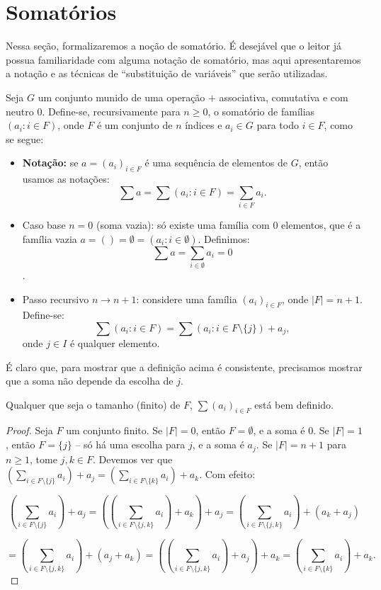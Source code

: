 \section{Somatórios}

Nessa seção, formalizaremos a noção de somatório.
É desejável que o leitor já possua familiaridade com alguma notação de somatório, mas aqui apresentaremos a notação e as técnicas de ``substituição de variáveis'' que serão utilizadas.

\begin{definition}
Seja $G$ um conjunto munido de uma operação $+$ associativa, comutativa e com neutro $0$.
Define-se, recursivamente para $n\geq 0$, o somatório de famílias $(a_i: i \in F)$, onde $F$ é um conjunto de $n$ índices e $a_i \in G$ para todo $i \in F$, como se segue:

\begin{itemize}
    \item \textbf{Notação:} se $a=(a_i)_{i\in F}$ é uma sequência de elementos de $G$, então usamos as notações:
    \[\sum a=\sum(a_i: i\in F)=\sum_{i\in F} a_i.\]
    \item Caso base $n=0$ (soma vazia): só existe uma família com $0$ elementos, que é a família vazia $a=()=\emptyset=(a_i:i\in \emptyset)$.
    Definimos: \[\sum a=\sum_{i \in \emptyset}a_i=0\].
    \item Passo recursivo $n\rightarrow n+1$: considere uma família $(a_i)_{i\in F}$, onde $|F|=n+1$.
    Define-se:
    \[\sum(a_i: i \in F)=\sum(a_i: i \in F\setminus\{j\})+a_j,\]
    onde $j \in I$ é qualquer elemento.
\end{itemize}
\end{definition}
É claro que, para mostrar que a definição acima é consistente, precisamos mostrar que a soma não depende da escolha de $j$.

\begin{lemma}
Qualquer que seja o tamanho (finito) de $F$, $\sum(a_i)_{i\in F}$ está bem definido.
\end{lemma}

\begin{proof}
    Seja $F$ um conjunto finito.
Se $|F|=0$, então $F=\emptyset$, e a soma é $0$.
Se $|F|=1$, então $F=\{j\}$ -- só há uma escolha para $j$, e a soma é $a_j$.
    Se $|F|=n+1$ para $n\geq 1$, tome $j, k \in F$.
    Devemos ver que $\left(\sum_{i\in F\setminus\{j\}} a_i\right)+a_j=\left(\sum_{i\in F\setminus\{k\}} a_i\right)+a_k$.
    Com efeito:

    \[\left(\sum_{i\in F\setminus\{j\}} a_i\right)+a_j=\left(\left(\sum_{i\in F\setminus\{j, k\}} a_i\right)+a_k\right)+a_j=\left(\sum_{i\in F\setminus\{j, k\}} a_i\right)+(a_k+a_j)\]

    \[=\left(\sum_{i\in F\setminus\{j, k\}} a_i\right)+(a_j+a_k)=\left(\left(\sum_{i\in F\setminus\{j, k\}} a_i\right)+a_j\right)+a_k=\left(\sum_{i\in F\setminus\{k\}} a_i\right)+a_k.\]
\end{proof}

